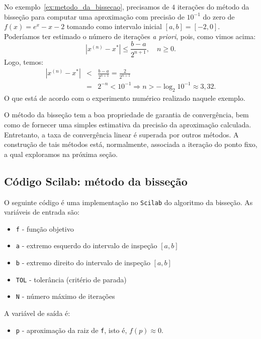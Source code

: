 \begin{ex}No exemplo~\ref{ex:metodo_da_bissecao}, precisamos de $4$ iterações do método da bisseção para computar uma aproximação com precisão de $10^{-1}$ do zero de $f(x) = e^x - x - 2$ tomando como intervalo inicial $[a, b] = [-2, 0]$. Poderíamos ter estimado o número de iterações \emph{a priori}, pois, como vimos acima:
  \begin{equation*}
    |x^{(n)}-x^*|\leq \frac{b-a}{2^{n+1}},\quad n\geq 0.
  \end{equation*}
Logo, temos:
\begin{eqnarray*}
  |x^{(n)} - x^*| &<& \frac{b - a}{2^{n+1}} = \frac{2}{2^{n+1}}\\
  &=& 2^{-n} < 10^{-1} \Rightarrow  n > -\log_2 10^{-1} \approx 3,32.
\end{eqnarray*}
O que está de acordo com o experimento numérico realizado naquele exemplo.
\end{ex}

O método da bisseção tem a boa propriedade de garantia de convergência, bem como de fornecer uma simples estimativa da precisão da aproximação calculada. Entretanto, a taxa de convergência linear é superada por outros métodos. A construção de tais métodos está, normalmente, associada a iteração do ponto fixo, a qual exploramos na próxima seção.

\ifisscilab
\subsection{Código Scilab: método da bisseção}\label{subsec:codigo_bissecao}

O seguinte código é uma implementação no \verb+Scilab+ do algoritmo da bisseção. As variáveis de entrada são:
\begin{itemize}
\item \verb+f+ - função objetivo
\item \verb+a+ - extremo esquerdo do intervalo de inspeção $[a, b]$
\item \verb+b+ - extremo direito do intervalo de inspeção $[a, b]$
\item \verb+TOL+ - tolerância (critério de parada)
\item \verb+N+ - número máximo de iterações
\end{itemize}
A variável de saída é:
\begin{itemize}
\item \verb+p+ - aproximação da raiz de \verb+f+, isto é, $f(p) \approx 0$.
\end{itemize}

